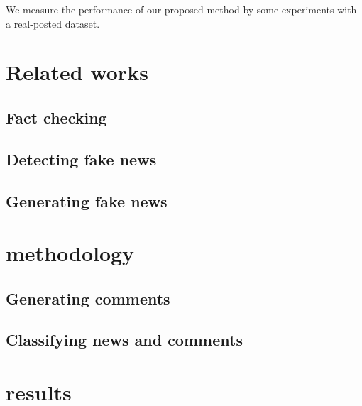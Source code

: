 \documentclass[conference]{IEEEtran}
\begin{document}
We measure the performance of our proposed method by some experiments with a real-posted dataset.

\section{Related works}
\subsection{Fact checking}
\subsection{Detecting fake news}
\subsection{Generating fake news}

\section{methodology}
\subsection{Generating comments}
\subsection{Classifying news and comments}

\section{results}
\end{document}
